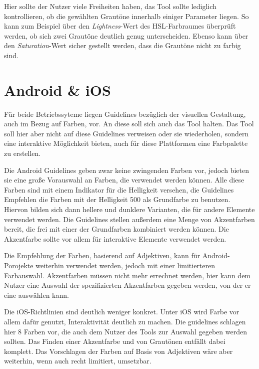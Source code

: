 Hier sollte der Nutzer viele Freiheiten haben, das Tool sollte lediglich kontrollieren, ob die gewählten Grautöne innerhalb einiger Parameter liegen. So kann zum Beispiel über den \textit{Lightness}-Wert des HSL-Farbraumes überprüft werden, ob sich zwei Grautöne deutlich genug unterscheiden. Ebenso kann über den \textit{Saturation}-Wert sicher gestellt werden, dass die Grautöne nicht zu farbig sind.


\section{Android \& iOS}\label{androidios}

Für beide Betriebssyteme liegen Guidelines bezüglich der visuellen Gestaltung, auch im Bezug auf Farben, vor. An diese soll sich auch das Tool halten. Das Tool soll hier aber nicht auf diese Guidelines verweisen oder sie wiederholen, sondern eine interaktive Möglichkeit bieten, auch für diese Plattformen eine Farbpalette zu erstellen.

Die Android Guidelines geben zwar keine zwingenden Farben vor, jedoch bieten sie eine große Vorauswahl an Farben, die verwendet werden können. Alle diese Farben sind mit einem Indikator für die Helligkeit versehen, die Guidelines Empfehlen die Farben mit der Helligkeit 500 als Grundfarbe zu benutzen. Hiervon bilden sich dann hellere und dunklere Varianten, die für andere Elemente verwendet werden.
Die Guidelines stellen außerdem eine Menge von Akzentfarben bereit, die frei mit einer der Grundfarben kombiniert werden können. Die Akzentfarbe sollte vor allem für interaktive Elemente verwendet werden.

Die Empfehlung der Farben, basierend auf Adjektiven, kann für Android-Porojekte weiterhin verwendet werden, jedoch mit einer limitierteren Farbauswahl. Akzentfarben müssen nicht mehr errechnet werden, hier kann dem Nutzer eine Auswahl der spezifizierten Akzentfarben gegeben werden, von der er eine auswählen kann.

Die iOS-Richtlinien sind deutlich weniger konkret. Unter iOS wird Farbe vor allem dafür genutzt, Interaktivität deutlich zu machen. Die guidelines schlagen hier 8 Farben vor, die auch dem Nutzer des Tools zur Auswahl gegeben werden sollten. Das Finden einer Akzentfarbe und von Grautönen entfällt dabei komplett. Das Vorschlagen der Farben auf Basis von Adjektiven wäre aber weiterhin, wenn auch recht limitiert, umsetzbar.


